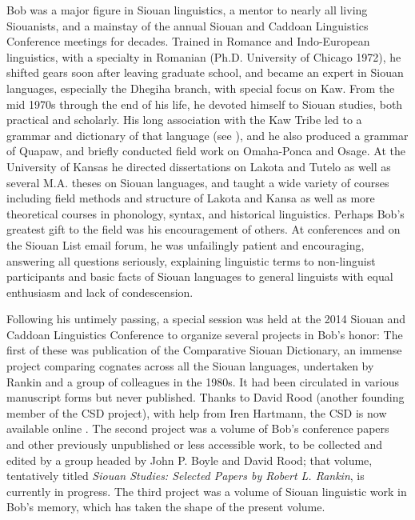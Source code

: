 \begin{refsection}
Bob was a major figure in Siouan linguistics, a mentor to nearly all living Siouanists, and a mainstay of the annual Siouan and Caddoan Linguistics Conference meetings for decades. Trained in Romance and Indo-European linguistics, with a specialty in Romanian (Ph.D. University of Chicago 1972), he shifted gears soon after leaving graduate school, and became an expert in Siouan languages, especially the Dhegiha branch, with special focus on Kaw. From the mid 1970s through the end of his life, he devoted himself to Siouan studies, both practical and scholarly. His long association with the Kaw Tribe led to a grammar and dictionary of that language (see \citealt{Cumberland2016}), and he also produced a grammar of Quapaw, and briefly conducted field work on Omaha-Ponca and Osage. At the University of Kansas he directed dissertations on Lakota \citep{Trechter1995} and Tutelo \citep{Oliverio1996} as well as several M.A. theses on Siouan languages, and taught a wide variety of courses including field methods and structure of Lakota and Kansa as well as more theoretical courses in phonology, syntax, and historical linguistics. Perhaps Bob's greatest gift to the field was his encouragement of others. At conferences and on the Siouan List email forum, he was unfailingly patient and encouraging, answering all questions seriously, explaining linguistic terms to non-linguist participants and basic facts of Siouan languages to general linguists with equal enthusiasm and lack of condescension.

Following his untimely passing, a special session was held at the 2014 Siouan and Caddoan Linguistics Conference to organize several projects in Bob's honor: The first of these was publication of the Comparative Siouan Dictionary, an immense project comparing cognates across all the Siouan languages, undertaken by Rankin and a group of colleagues in the 1980s. It had been circulated in various manuscript forms but never published. Thanks to David Rood (another founding member of the CSD project), with help from Iren Hartmann, the CSD is now available online \citep{RankinEtAl2015AccessSeptember}. The second project was a volume of Bob's conference papers and other previously unpublished or less accessible work, to be collected and edited by a group headed by John P. Boyle and David Rood; that volume, tentatively titled \textit{Siouan Studies: Selected Papers by Robert L. Rankin}, is currently in progress. The third project was a volume of Siouan linguistic work in Bob's memory, which has taken the shape of the present volume.

\printbibliography[heading=subbibliography,notkeyword=this]

%

\end{refsection}

